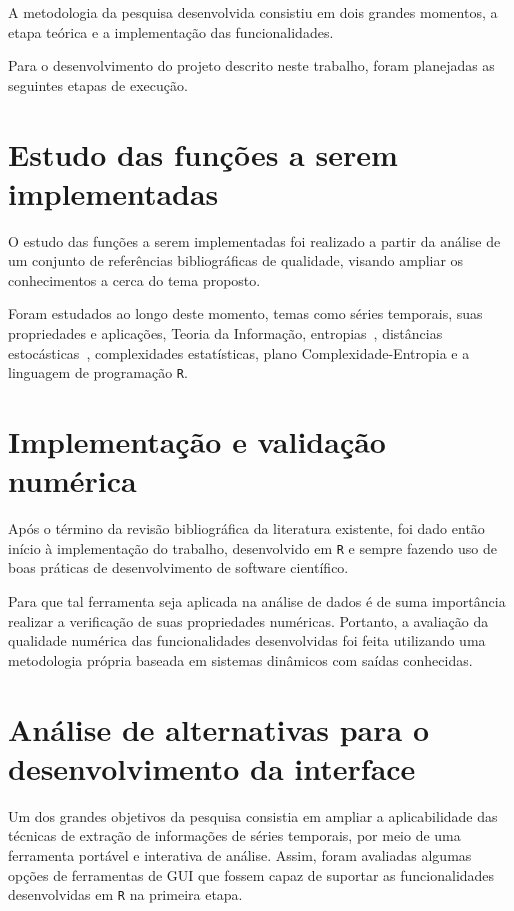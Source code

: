 
A metodologia da pesquisa desenvolvida consistiu em dois grandes momentos, a etapa teórica e a implementação das funcionalidades.

Para o desenvolvimento do projeto descrito neste trabalho, foram planejadas as seguintes etapas de execução.

\section{Estudo das funções a serem implementadas}

O estudo das funções a serem implementadas foi realizado a partir da análise de um conjunto de referências bibliográficas de qualidade, visando ampliar os conhecimentos a cerca do tema proposto.

Foram estudados ao longo deste momento, temas como séries temporais, suas propriedades e aplicações, Teoria da Informação, entropias~\citep{salicruetal1993}, distâncias estocásticas~\citep{StatisticalInferenceBasedonDivergenceMeasures}, complexidades estatísticas, plano Complexidade-Entropia e a linguagem de programação \texttt R.

\section{Implementação e validação numérica}

Após o término da revisão bibliográfica da literatura existente, foi dado então início à implementação do trabalho, desenvolvido em \texttt R e sempre fazendo uso de boas práticas de desenvolvimento de software científico.

Para que tal ferramenta seja aplicada na análise de dados é de suma importância realizar a verificação de suas propriedades numéricas. 
Portanto, a avaliação da qualidade numérica das funcionalidades desenvolvidas foi feita utilizando uma metodologia própria baseada em sistemas dinâmicos com saídas conhecidas.

\section{Análise de alternativas para o desenvolvimento da interface}

Um dos grandes objetivos da pesquisa consistia em ampliar a aplicabilidade das técnicas de extração de informações de séries temporais, por meio de uma ferramenta portável e interativa de análise. Assim, foram avaliadas algumas opções de ferramentas de GUI que fossem capaz de suportar as funcionalidades desenvolvidas em \texttt R na primeira etapa.

